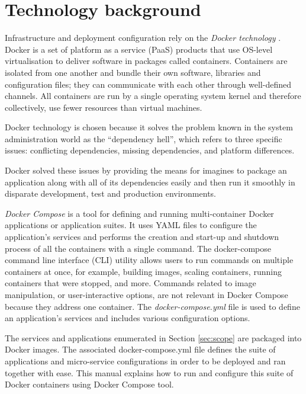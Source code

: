 \section{Technology background}
\label{sec:background}

	Infrastructure and deployment configuration rely on the \textit{Docker technology} \citep{docker-merkel2014docker, docker}. Docker is a set of platform as a service (PaaS) products that use OS-level virtualisation to deliver software in packages called containers. Containers are isolated from one another and bundle their own software, libraries and configuration files; they can communicate with each other through well-defined channels. All containers are run by a single operating system kernel and therefore collectively, use fewer resources than virtual machines.

	Docker technology is chosen because it solves the problem known in the system administration world as the ``dependency hell'', which refers to three specific issues: conflicting dependencies, missing dependencies, and platform differences.

	Docker solved these issues by providing the means for imagines to package an application along with all of its dependencies easily and then run it smoothly in disparate development, test and production environments.
		
	\textit{Docker Compose} is a tool for defining and running multi-container Docker applications or application suites. It uses YAML files to configure the application's services and performs the creation and start-up and shutdown process of all the containers with a single command. The docker-compose command line interface (CLI) utility allows users to run commands on multiple containers at once, for example, building images, scaling containers, running containers that were stopped, and more. Commands related to image manipulation, or user-interactive options, are not relevant in Docker Compose because they address one container. The \textit{docker-compose.yml} file is used to define an application's services and includes various configuration options.

	The services and applications enumerated in Section \ref{sec:scope} are packaged into Docker images. The associated docker-compose.yml file defines the suite of applications and micro-service configurations in order to be deployed and ran together with ease. This manual explains how to run and configure this suite of Docker containers using Docker Compose tool.